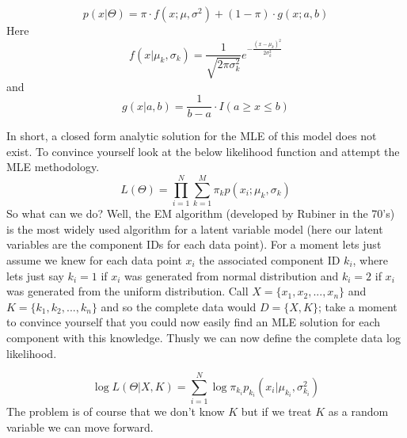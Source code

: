 \begin{equation}
p(x|\Theta) = \pi\cdot f(x; \mu, \sigma^2) + (1-\pi)\cdot g(x; a,b)
\end{equation}
Here 
\begin{equation}
f(x|\mu_k,\sigma_k) = \frac{1}{\sqrt{2\pi\sigma_k^2}}e^{-\frac{(x-\mu_k)^2}{2\sigma_k^2}}
\end{equation}
and 
\begin{equation}
g(x|a,b) = \frac{1}{b-a}\cdot I(a\geq x \leq b)
\end{equation}

In short, a closed form analytic solution for the MLE of this model does not exist. To convince yourself look at the below likelihood function and attempt the MLE methodology. 
\begin{equation}
L(\Theta) = \prod_{i=1}^N \sum_{k=1}^M \pi_k p(x_i; \mu_k, \sigma_k)
\end{equation}
So what can we do? Well, the EM algorithm (developed by Rubiner in the 70's) is the most widely used algorithm for a latent variable model (here our latent variables are the component IDs for each data point). For a moment lets just assume we knew for each data point $x_i$ the associated component ID $k_i$, where lets just say $k_i=1$ if $x_i$ was generated from normal distribution and $k_i=2$ if $x_i$ was generated from the uniform distribution. Call $X=\{x_1, x_2, ..., x_n\}$ and $K=\{k_1,k_2, ... , k_n\}$ and so the complete data would $D=\{X, K\}$; take a moment to convince yourself that you could now easily find an MLE solution for each component with this knowledge. Thusly we can now define the complete data log likelihood. 

\begin{equation}
\log L(\Theta|X, K) = \sum_{i=1}^N\log{\pi_{k_i} p_{k_i}(x_i|\mu_{k_i}, \sigma^2_{k_i})}
\end{equation}
\noindent
The problem is of course that we don't know $K$ but if we treat $K$ as a random variable we can move forward. 
